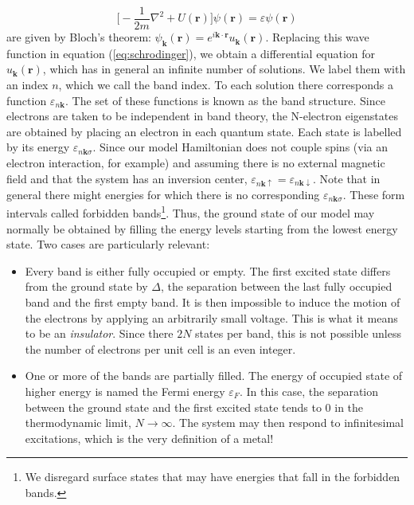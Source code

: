 \documentclass[10pt, twocolumn, twoside]{article}
\begin{document}
\begin{equation}\label{eq:schrodinger}
\bigg[ -\frac{1}{2m} \nabla^2 + U(\bm r) \bigg] \psi (\bm r) = \varepsilon \psi (\bm r)
\end{equation}
are given by Bloch's theorem: $\psi_{\bm k} (\bm r) = e^{i\bm k \cdot \bm r} u_{\bm k} (\bm r)$. Replacing this wave function in equation (\ref{eq:schrodinger}), we obtain a differential equation for $u_{\bm k} (\bm r)$, which has in general an infinite number of solutions. We label them with an index $n$, which we call the band index. To each solution there corresponds a function $\varepsilon_{n\bm k}$. The set of these functions is known as the band structure. Since electrons are taken to be independent in band theory, the N-electron eigenstates are obtained by placing an electron in each quantum state. Each state is labelled by its energy $\varepsilon_{n\bm k \sigma}$. Since our model Hamiltonian does not couple spins (via an electron interaction, for example) and assuming there is no external magnetic field and that the system has an inversion center, $\varepsilon_{n\bm k \uparrow} = \varepsilon_{n\bm k \downarrow}$. Note that in general there might energies for which there is no corresponding $\varepsilon_{n\bm k \sigma}$. These form intervals called forbidden bands\footnote{We disregard surface states that may have energies that fall in the forbidden bands.}. Thus, the ground state of our model may normally be obtained by filling the energy levels starting from the lowest energy state. Two cases are particularly relevant:
\begin{itemize}
\item Every band is either fully occupied or empty. The first excited state differs from the ground state by $\Delta$, the separation between the last fully occupied band and the first empty band. It is then impossible to induce the motion of the electrons by applying an arbitrarily small voltage. This is what it means to be an \emph{insulator}. Since there $2N$ states per band, this is not possible unless the number of electrons per unit cell is an even integer.
\item One or more of the bands are partially filled. The energy of occupied state of higher energy is named the Fermi energy $\varepsilon_F$. In this case, the separation between the ground state and the first excited state tends to $0$ in the thermodynamic limit, $N \rightarrow \infty$. The system may then respond to infinitesimal excitations, which is the very definition of a metal!
\end{itemize}
\end{document}

